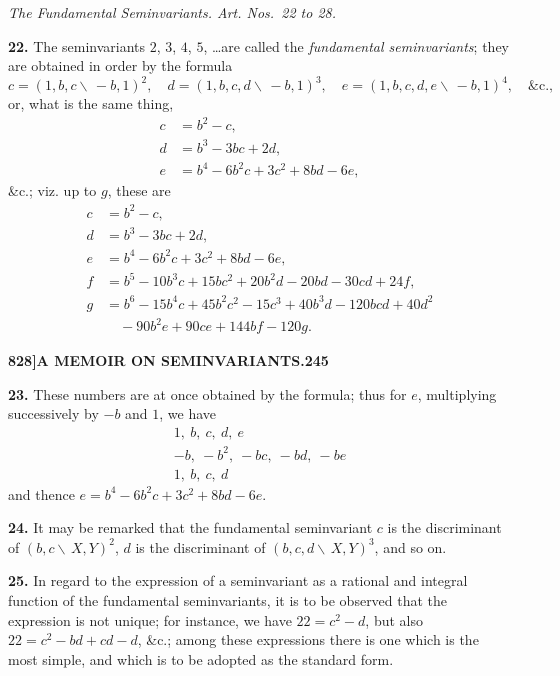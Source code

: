 \documentclass[11pt,a4paper]{book}
\begin{document}
\begin{center}
\textit{The Fundamental Seminvariants. Art. Nos.~22 to 28.}
\end{center}

\noindent\textbf{22.} The seminvariants $2$, $3$, $4$, $5$, \dots are called the \textit{fundamental seminvariants}; they are obtained in order by the formula
\[
c = (1, b, c \!\!\!\backslash\, -b, 1)^2, \quad d = (1, b, c, d \!\!\!\backslash\, -b, 1)^3, \quad e = (1, b, c, d, e \!\!\!\backslash\, -b, 1)^4, \quad \&\text{c.},
\]
or, what is the same thing,
\begin{align*}
c &= b^2 - c, \\
d &= b^3 - 3bc + 2d, \\
e &= b^4 - 6b^2c + 3c^2 + 8bd - 6e,
\end{align*}
\&c.; viz. up to $g$, these are
\begin{align*}
c &= b^2 - c, \\
d &= b^3 - 3bc + 2d, \\
e &= b^4 - 6b^2c + 3c^2 + 8bd - 6e, \\
f &= b^5 - 10b^3c + 15bc^2 + 20b^2d - 20bd - 30cd + 24f, \\
g &= b^6 - 15b^4c + 45b^2c^2 - 15c^3 + 40b^3d - 120bcd + 40d^2 \\
  &\quad - 90b^2e + 90ce + 144bf - 120g.
\end{align*}

\newpage
\setcounter{page}{245}

\noindent\textbf{828]}\hfill\textbf{A MEMOIR ON SEMINVARIANTS.}\hfill\textbf{245}

\bigskip

\noindent\textbf{23.} These numbers are at once obtained by the formula; thus for $e$, multiplying successively by $-b$ and $1$, we have
\begin{align*}
1,\ b,\ c,\ d,\ e \\
-b,\ -b^2,\ -bc,\ -bd,\ -be \\
1,\ b,\ c,\ d
\end{align*}
and thence $e = b^4 - 6b^2c + 3c^2 + 8bd - 6e$.

\noindent\textbf{24.} It may be remarked that the fundamental seminvariant $c$ is the discriminant of $(b, c \!\!\!\backslash\, X, Y)^2$, $d$ is the discriminant of $(b, c, d \!\!\!\backslash\, X, Y)^3$, and so on.

\noindent\textbf{25.} In regard to the expression of a seminvariant as a rational and integral function of the fundamental seminvariants, it is to be observed that the expression is not unique; for instance, we have $22 = c^2 - d$, but also $22 = c^2 - bd + cd - d$, \&c.; among these expressions there is one which is the most simple, and which is to be adopted as the standard form.
\end{document}
